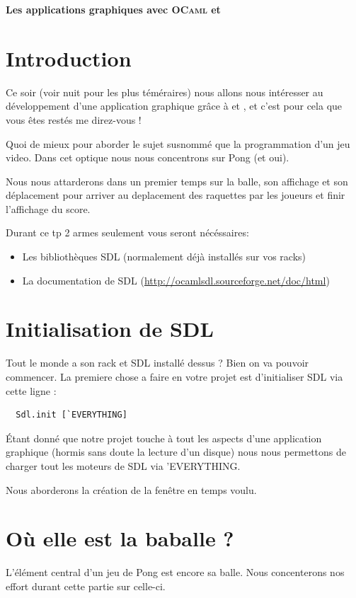 \documentclass[a4paper]{article}
\begin{document}
\begin{center}
  {\Large {\bf Les applications graphiques avec 
  \textsc{OCaml} et }}
\end{center}

\bigskip

\section*{Introduction}

Ce soir (voir nuit pour les plus téméraires) nous allons nous intéresser au développement d'une application graphique grâce à  et , et c'est pour cela que vous êtes restés me direz-vous !\par
Quoi de mieux pour aborder le sujet susnommé que la programmation d'un jeu video. Dans cet optique nous nous concentrons sur Pong (et oui).\par 
Nous nous attarderons dans un premier temps sur la balle, son affichage et son déplacement pour arriver au deplacement des raquettes par les joueurs et finir l'affichage du score.

Durant ce tp 2 armes seulement vous seront nécéssaires:
\begin{itemize}
\item Les bibliothèques SDL (normalement déjà installés sur vos racks)
\item La documentation de SDL (\url{http://ocamlsdl.sourceforge.net/doc/html})
\end{itemize}

\section{Initialisation de SDL}
Tout le monde a son rack et SDL installé dessus ? Bien on va pouvoir commencer.
La premiere chose a faire en votre projet est d'initialiser SDL via cette ligne :

\begin{lstlisting}
  Sdl.init [`EVERYTHING]
\end{lstlisting}

Étant donné que notre projet touche à tout les aspects d'une application graphique (hormis sans doute la lecture d'un disque) nous nous permettons de charger tout les moteurs de SDL via 'EVERYTHING.\par
Nous aborderons la création de la fenêtre en temps voulu.

\section{Où elle est la baballe ?}
L'élément central d'un jeu de Pong est encore sa balle. Nous concenterons nos effort durant cette partie sur celle-ci.\par\bigskip
\end{document}
